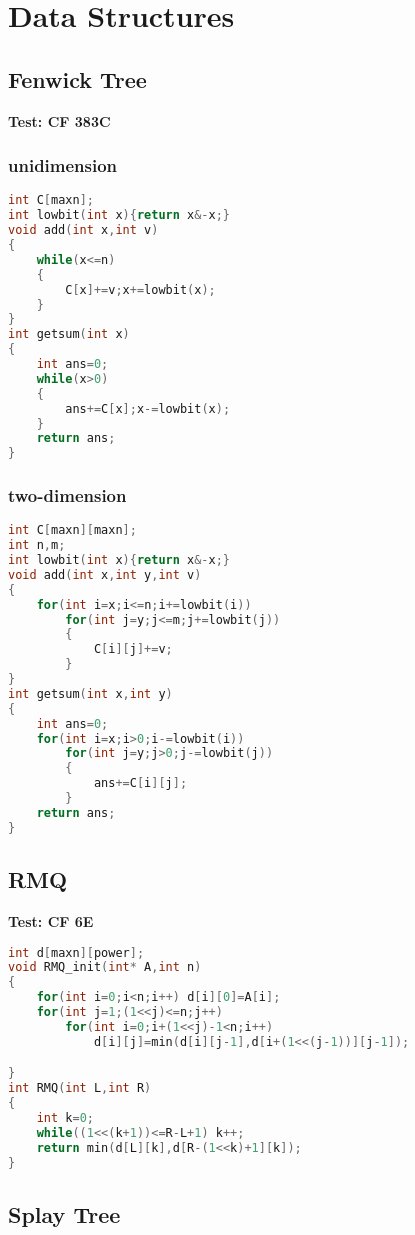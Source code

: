 \chapter{Data Structures}
 \section{Fenwick Tree}
  \textbf{Test: CF 383C}
  \subsection{unidimension}
  \begin{lstlisting}[language=C++]
int C[maxn];
int lowbit(int x){return x&-x;}
void add(int x,int v) 
{
    while(x<=n)
    {
        C[x]+=v;x+=lowbit(x);
    }
}
int getsum(int x)
{
    int ans=0;
    while(x>0)
    {
        ans+=C[x];x-=lowbit(x);
    }
    return ans;
}
  \end{lstlisting}
  \subsection{two-dimension}
  \begin{lstlisting}[language=C++]
int C[maxn][maxn];
int n,m;
int lowbit(int x){return x&-x;}
void add(int x,int y,int v)
{
    for(int i=x;i<=n;i+=lowbit(i))
        for(int j=y;j<=m;j+=lowbit(j))
        {
            C[i][j]+=v;
        }
}
int getsum(int x,int y) 
{
    int ans=0;
    for(int i=x;i>0;i-=lowbit(i))
        for(int j=y;j>0;j-=lowbit(j))
        {
            ans+=C[i][j];
        }
    return ans;
}
  \end{lstlisting}

 \section{RMQ}
 \textbf{Test: CF 6E}
 \begin{lstlisting}[language=C++]
int d[maxn][power];
void RMQ_init(int* A,int n)
{
	for(int i=0;i<n;i++) d[i][0]=A[i];
	for(int j=1;(1<<j)<=n;j++)
		for(int i=0;i+(1<<j)-1<n;i++)
			d[i][j]=min(d[i][j-1],d[i+(1<<(j-1))][j-1]);

}
int RMQ(int L,int R)
{
	int k=0;
	while((1<<(k+1))<=R-L+1) k++;
	return min(d[L][k],d[R-(1<<k)+1][k]);
}
 \end{lstlisting}

 \section{Splay Tree}
